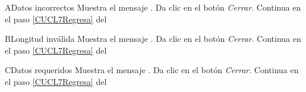 
\begin{UCtrayectoriaA}{A}{Datos incorrectos}
	\UCpaso Muestra el mensaje . 
	\UCpaso[\UCactor] Da clic en el botón \textit{Cerrar}.
	\UCpaso[\UCactor] Continua en el paso \ref{CUCL7Regresa} del 

\end{UCtrayectoriaA} 

\begin{UCtrayectoriaA}{B}{Longitud inválida}
	\UCpaso Muestra el mensaje . 
	\UCpaso[\UCactor] Da clic en el botón \textit{Cerrar}.
	\UCpaso[\UCactor] Continua en el paso \ref{CUCL7Regresa} del 

\end{UCtrayectoriaA}

\begin{UCtrayectoriaA}{C}{Datos requeridos}
	\UCpaso Muestra el mensaje . 
	\UCpaso[\UCactor] Da clic en el botón \textit{Cerrar}.
	\UCpaso[\UCactor] Continua en el paso \ref{CUCL7Regresa} del 

\end{UCtrayectoriaA}



		
